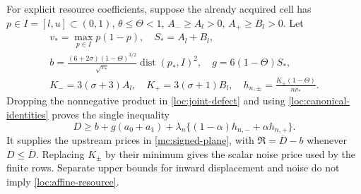 For explicit resource coefficients, suppose the already acquired cell
has $p\in I=[l,u]\subset(0,1)$, $\theta\le\Theta<1$,
$A_-\ge A_l>0$, $A_+\ge B_l>0$. Let
\begin{gather*}
 v_* =\max_{p\in I}p(1-p),\quad S_*=A_l+B_l,\\
 b=\frac{(6+2\sigma)(1-\Theta)^{3/2}}{\sqrt{v_*}}
                      \operatorname{dist}(p_*,I)^2,\quad
 g=6(1-\Theta)S_*,\\
 K_-=3(\sigma+3)A_l,\quad K_+=3(\sigma+1)B_l,\quad
 h_{n,\pm}=\frac{K_\pm(1-\Theta)}{nv_*}.
\end{gather*}
Dropping the nonnegative product in \eqref{loc:joint-defect} and
using \eqref{loc:canonical-identities} proves the single inequality
\begin{equation}\label{loc:affine-resource}
 D\ge b+g(a_0+a_1)
       +\lambda_n\{(1-\alpha)h_{n,-}+\alpha h_{n,+}\}.
\end{equation}
It supplies the upstream prices in \eqref{mc:signed-plane}, with
$\mathfrak R=\overline D-b$ whenever
$D\le\overline D$. Replacing $K_\pm$ by their minimum gives the
scalar noise price used by the finite rows. Separate upper bounds for
inward displacement and noise do not imply \eqref{loc:affine-resource}.

